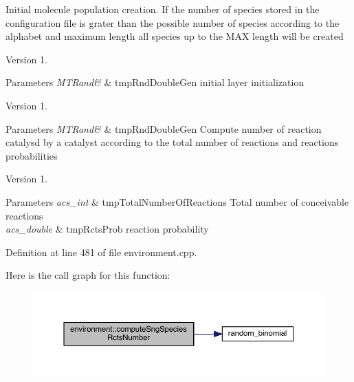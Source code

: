 Initial molecule population creation. If the number of species stored in the configuration file is grater than the possible number of species according to the alphabet and maximum length all species up to the M\-A\-X length will be created \begin{DoxyVersion}{Version}
1. 
\end{DoxyVersion}

\begin{DoxyParams}{Parameters}
{\em M\-T\-Rand\&} & tmp\-Rnd\-Double\-Gen initial layer initialization \\
\hline
\end{DoxyParams}
\begin{DoxyVersion}{Version}
1. 
\end{DoxyVersion}

\begin{DoxyParams}{Parameters}
{\em M\-T\-Rand\&} & tmp\-Rnd\-Double\-Gen Compute number of reaction catalysd by a catalyst according to the total number of reactions and reactions probabilities \\
\hline
\end{DoxyParams}
\begin{DoxyVersion}{Version}
1. 
\end{DoxyVersion}

\begin{DoxyParams}{Parameters}
{\em acs\-\_\-int} & tmp\-Total\-Number\-Of\-Reactions Total number of conceivable reactions \\
\hline
{\em acs\-\_\-double} & tmp\-Rcts\-Prob reaction probability \\
\hline
\end{DoxyParams}


Definition at line 481 of file environment.\-cpp.



Here is the call graph for this function\-:
\nopagebreak
\begin{figure}[H]
\begin{center}
\leavevmode
\includegraphics[width=350pt]{a00014_a0fd3cb062d35d2f6dd8961e95dd477b7_cgraph}
\end{center}
\end{figure}




